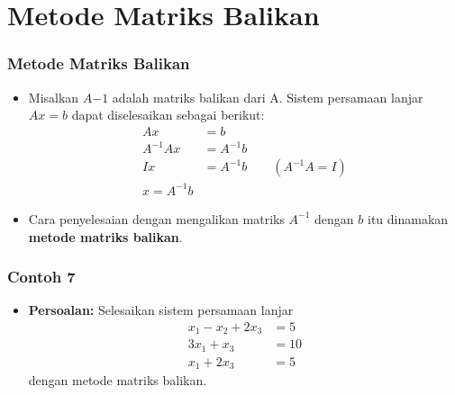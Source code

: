 \documentclass[pdflatex,compress,mathserif]{beamer}
\begin{document}
\section{Metode Matriks Balikan}

\begin{frame}
	\frametitle{Metode Matriks Balikan}
	\begin{itemize}
		\item Misalkan $ A{-1} $ adalah matriks balikan dari A. Sistem persamaan lanjar $ Ax = b $ dapat diselesaikan sebagai berikut:
		\begin{align*}
			Ax &= b \\
			A^{-1}Ax &= A^{-1}b \\
			Ix &= A^{-1}b \qquad (A^{-1}A = I)\\
			x = A^{-1}b
		\end{align*}
		\item Cara penyelesaian dengan mengalikan matriks $ A^{-1} $ dengan $ b $ itu dinamakan \textbf{metode matriks balikan}.
	\end{itemize}
\end{frame}

\begin{frame}
	\frametitle{Contoh 7}
	\begin{itemize}
		\item \textbf{Persoalan:} Selesaikan sistem persamaan lanjar
		\begin{align*}
			x_1 - x_2 + 2x_3 &= 5 \\
			3x_1 + x_3 &= 10 \\
			x_1 + 2x_3 &= 5
		\end{align*}
		dengan metode matriks balikan.
	\end{itemize}
\end{frame}
\end{document}
